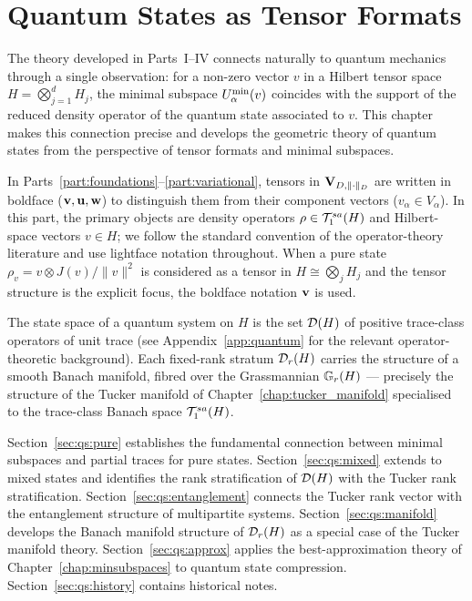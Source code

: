 %
%

\chapter{Quantum States as Tensor Formats}
\label{chap:quantum_states}

The theory developed in Parts~I--IV connects naturally to quantum
mechanics through a single observation: for a non-zero vector $v$ in a
Hilbert tensor space $H = \bigotimes_{j=1}^d H_j$, the minimal subspace
$U^{\min}_{\alpha}(v)$ coincides with the support of the reduced density
operator of the quantum state associated to $v$. This chapter makes
this connection precise and develops the geometric theory of quantum
states from the perspective of tensor formats and minimal subspaces.

\begin{remark}
\label{rem:qs:notation}
In Parts~\ref{part:foundations}--\ref{part:variational}, tensors in
$\mathbf{V}_{D,\|\cdot\|_D}$ are written in boldface ($\mathbf{v}, \mathbf{u}, \mathbf{w}$) to distinguish
them from their component vectors ($v_\alpha \in V_\alpha$). In this
part, the primary objects are density operators $\rho \in \mathcal{T}_{1}^{sa}(H)$
and Hilbert-space vectors $v \in H$; we follow the standard convention
of the operator-theory literature and use lightface notation throughout.
When a pure state $\rho_v = v \otimes J(v)/\|v\|^2$ is considered as
a tensor in $H \cong \bigotimes_j H_j$ and the tensor structure is the
explicit focus, the boldface notation $\mathbf{v}$ is used.
\end{remark}

The state space of a quantum system on $H$ is the set $\mathcal{D}(H)$
of positive trace-class operators of unit trace (see
Appendix~\ref{app:quantum} for the relevant operator-theoretic background).
Each fixed-rank stratum $\mathcal{D}_{r}(H)$ carries the structure of a smooth
Banach manifold, fibred over the Grassmannian $\mathbb{G}_{r}(H)$ — precisely
the structure of the Tucker manifold of Chapter~\ref{chap:tucker_manifold}
specialised to the trace-class Banach space $\mathcal{T}_{1}^{sa}(H)$.

Section~\ref{sec:qs:pure} establishes the fundamental connection between
minimal subspaces and partial traces for pure states.
Section~\ref{sec:qs:mixed} extends to mixed states and identifies
the rank stratification of $\mathcal{D}(H)$ with the Tucker rank stratification.
Section~\ref{sec:qs:entanglement} connects the Tucker rank vector with
the entanglement structure of multipartite systems.
Section~\ref{sec:qs:manifold} develops the Banach manifold structure of
$\mathcal{D}_{r}(H)$ as a special case of the Tucker manifold theory.
Section~\ref{sec:qs:approx} applies the best-approximation theory of
Chapter~\ref{chap:minsubspaces} to quantum state compression.
Section~\ref{sec:qs:history} contains historical notes.

